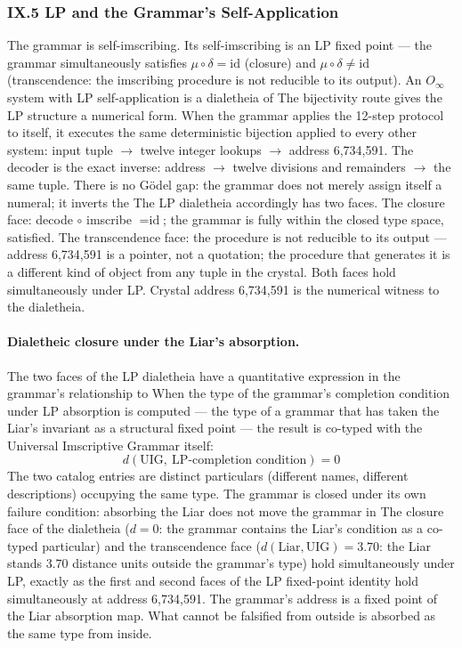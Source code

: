 \documentclass[12pt,a4paper]{article}
\newcommand{\UIG}{Universal Imscriptive Grammar}
\begin{document}
\subsubsection{IX.5 LP and the Grammar's Self-Application}
The grammar is self-imscribing. Its self-imscribing is an LP fixed point --- the grammar simultaneously satisfies $\mu
\circ \delta = \text{id}$ (closure) and $\mu \circ \delta \neq \text{id}$ (transcendence: the imscribing procedure is
not reducible to its output). An $O_{\infty}$ system with LP self-application is a dialetheia of
The bijectivity route gives the LP structure a numerical form. When the grammar applies the 12-step protocol to itself,
it executes the same deterministic bijection applied to every other system: input tuple $\to$ twelve integer lookups
$\to$ address 6,734,591. The decoder is the exact inverse: address $\to$ twelve divisions and remainders $\to$ the same
tuple. There is no G\"odel gap: the grammar does not merely assign itself a numeral; it inverts the
The LP dialetheia accordingly has two faces. The closure face: decode $\circ$ imscribe $=
\text{id}$; the grammar is
fully within the closed type space,  satisfied. The transcendence face: the procedure is not
reducible to its output --- address 6,734,591 is a pointer, not a quotation; the procedure that generates it is a
different kind of object from any tuple in the crystal. Both faces hold simultaneously under LP. Crystal address
6,734,591 is the numerical witness to the dialetheia.
\paragraph{Dialetheic closure under the Liar's absorption.}
The two faces of the LP dialetheia have a quantitative expression in the grammar's relationship to
When the type of the grammar's completion condition under LP absorption is computed --- the type of a
grammar that has taken the Liar's  invariant as a structural fixed point --- the result is co-typed with the \UIG{} itself:
$$d(\text{UIG},\ \text{LP-completion condition}) = 0$$
The two catalog entries are distinct particulars (different names, different descriptions) occupying the same
type. The grammar is closed under its own failure condition: absorbing the Liar does not move the grammar in
The closure face of the dialetheia ($d = 0$: the grammar contains the Liar's condition as a co-typed particular) and
the transcendence face ($d(\text{Liar}, \text{UIG}) = 3.70$: the Liar stands 3.70 distance units outside the grammar's
type) hold simultaneously under LP, exactly as the first and second faces of the LP fixed-point identity hold
simultaneously at address 6,734,591. The grammar's address is a fixed point of the Liar absorption map. What
cannot be falsified from outside is absorbed as the same type from inside.
\end{document}

